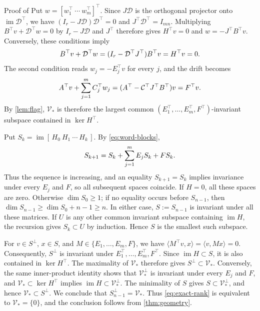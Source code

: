 \documentclass[twocolumn]{autart}
\begin{document}
\begin{pf*}{Proof of }
Put $w=[w_1^\top\ \cdots\ w_m^\top]^\top$.
Since $J\mathcal D$ is the orthogonal projector onto
$\operatorname{im}\mathcal D^\top$, we have
$(I_r-J\mathcal D)\mathcal D^\top=0$ and
$J^\top\mathcal D^\top=I_{mn}$. Multiplying
$B^\top v+\mathcal D^\top w=0$ by $I_r-J\mathcal D$ and $J^\top$
therefore gives
$
H^\top v=0$ and $w=-J^\top B^\top v$. 
Conversely, these conditions imply\vspace{-2mm}
\begin{equation*}
B^\top v+\mathcal D^\top w
=(I_r-\mathcal D^\top J^\top)B^\top v=H^\top v=0.\vspace{-2mm}
\end{equation*}
The second condition reads $w_j=-E_j^\top v$ for every $j$, and the
drift becomes\vspace{-3mm}
\begin{equation*}
A^\top v+\sum_{j=1}^mC_j^\top w_j
=(A^\top-\mathcal C^\top J^\top B^\top)v=F^\top v.\vspace{-3mm}
\end{equation*}
By \cref{lem:flag}, $\mathcal V_*$ is therefore the largest common
$(E_1^\top,\dots,E_m^\top,F^\top)$-invariant subspace contained in
$\ker H^\top$.

Put $S_k=\operatorname{im}[\,H_0\ H_1\ \cdots\ H_k\,]$.
By \cref{eq:word-blocks},\vspace{-3mm}
\begin{equation*}
S_{k+1}=S_k+\sum_{j=1}^mE_jS_k+FS_k.\vspace{-3mm}
\end{equation*}
Thus the sequence is increasing, and an equality $S_{k+1}=S_k$
implies invariance under every $E_j$ and $F$, so all subsequent
spaces coincide. If $H=0$, all these spaces are zero.
Otherwise $\dim S_0\geq1$; if no equality occurs before $S_{n-1}$,
then $\dim S_{n-1}\geq\dim S_0+n-1\geq n$.
In either case, $S:=S_{n-1}$ is invariant under all these matrices.
If $U$ is any other common invariant subspace containing
$\operatorname{im}H$, the recursion gives $S_k\subset U$ by
induction. Hence $S$ is the smallest such subspace.

For $v\in S^\perp$, $x\in S$, and
$M\in\{E_1,\dots,E_m,F\}$, we have
$
\langle M^\top v,x\rangle=\langle v,Mx\rangle=0.
$
Consequently, $S^\perp$ is invariant under
$E_1^\top,\dots,E_m^\top,F^\top$. Since $\operatorname{im}H\subset S$,
it is also contained in $\ker H^\top$.
The maximality of $\mathcal V_*$ therefore gives
$S^\perp\subset\mathcal V_*$.
Conversely, the same inner-product identity shows that
$\mathcal V_*^\perp$ is invariant under every $E_j$ and $F$,
and $\mathcal V_*\subset\ker H^\top$ implies
$\operatorname{im}H\subset\mathcal V_*^\perp$.
The minimality of $S$ gives $S\subset\mathcal V_*^\perp$,
and hence $\mathcal V_*\subset S^\perp$.
We conclude that $S_{n-1}^\perp=\mathcal V_*$.
Thus \cref{eq:exact-rank} is equivalent to $\mathcal V_*=\{0\}$,
and the conclusion follows from \cref{thm:geometry}.
\end{pf*}
\end{document}
